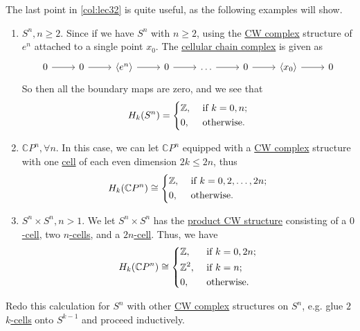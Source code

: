 \begin{eg}
	The last point in \autoref{col:lec32} is quite useful, as the following examples will show.
	\begin{enumerate}[(1)]
		\item \(S^n, n \geq 2\). Since if we have \(S^n\) with \(n \geq 2\), using the \hyperref[def:CW-Complex]{CW complex} structure of
		      \(e^n\) attached to a single point \(x_0\). The \hyperref[def:cellular-chain-complex]{cellular chain complex} is given as
		      \[
			      \begin{tikzcd}
				      0 & 0 & {\left<e^n\right>} & 0 & \dots & 0 & {\left<x_0\right>} & 0
				      \arrow[from=1-1, to=1-2]
				      \arrow[from=1-2, to=1-3]
				      \arrow[from=1-3, to=1-4]
				      \arrow[from=1-4, to=1-5]
				      \arrow[from=1-5, to=1-6]
				      \arrow[from=1-6, to=1-7]
				      \arrow[from=1-7, to=1-8]
			      \end{tikzcd}
		      \]
		      So then all the boundary maps are zero, and we see that
		      \[
			      H_k(S^n) = \begin{dcases}
				      \mathbb{Z}, & \text{ if } k=0, n ; \\
				      0,          & \text{ otherwise}.
			      \end{dcases}
		      \]
		\item \(\mathbb{C} P^n, \forall n\). In this case, we can let \(\mathbb{C} P^n\) equipped with a
		      \hyperref[def:CW-Complex]{CW complex} structure with one \hyperref[def:cell]{cell} of each even dimension \(2k \leq 2n\), thus
		      \[
			      H_{k}(\mathbb{C} P^n) \cong \begin{dcases}
				      \mathbb{Z}, & \text{ if } k = 0, 2, \dots , 2n; \\
				      0,          & \text{ otherwise}.
			      \end{dcases}
		      \]
		\item \(S^n \times S^n, n > 1\). We let \(S^n \times S^n\) has the \hyperref[CW-complex-product]{product CW structure} consisting
		      of a \hyperref[def:cell]{\(0\)-cell}, two \hyperref[def:cell]{\(n\)-cells}, and a \hyperref[def:cell]{\(2n\)-cell}.
		      Thus, we have
		      \[
			      H_{k}(\mathbb{C} P^n) \cong \begin{dcases}
				      \mathbb{Z},      & \text{ if } k = 0, 2n; \\
				      \mathbb{Z}^{2} , & \text{ if } k = n;     \\
				      0,               & \text{ otherwise}.
			      \end{dcases}
		      \]
	\end{enumerate}
\end{eg}

\begin{exercise}
	Redo this calculation for \(S^n\) with other \hyperref[def:CW-Complex]{CW complex} structures on \(S^n\), e.g. glue \(2\) \hyperref[def:cell]{\(k\)-cells} onto \(S^{k - 1}\) and proceed inductively.
\end{exercise}